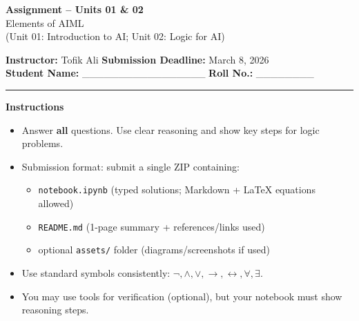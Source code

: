 \documentclass[11pt,a4paper]{article}
\newcommand{\SubmissionDeadline}{March 8, 2026}
\begin{document}
\begin{center}
  {\LARGE \textbf{Assignment -- Units 01 \& 02}}\\[0.25em]
  {\large Elements of AIML}\\[0.25em]
  \normalsize (Unit 01: Introduction to AI; Unit 02: Logic for AI)
\end{center}

\noindent
\textbf{Instructor:} Tofik Ali \hfill \textbf{Submission Deadline:} \SubmissionDeadline\\
\textbf{Student Name:} \_\_\_\_\_\_\_\_\_\_\_\_\_\_\_\_\_ \hfill \textbf{Roll No.:} \_\_\_\_\_\_\_\_\\

\vspace{0.6em}
\hrule
\vspace{0.8em}

\textbf{Instructions}
\begin{itemize}[leftmargin=*]
  \item Answer \textbf{all} questions. Use clear reasoning and show key steps for logic problems.
  \item Submission format: submit a single ZIP containing:
    \begin{itemize}[leftmargin=*]
      \item \texttt{notebook.ipynb} (typed solutions; Markdown + LaTeX equations allowed)
      \item \texttt{README.md} (1-page summary + references/links used)
      \item optional \texttt{assets/} folder (diagrams/screenshots if used)
    \end{itemize}
  \item Use standard symbols consistently: $\lnot, \land, \lor, \rightarrow, \leftrightarrow, \forall, \exists$.
  \item You may use tools for verification (optional), but your notebook must show reasoning steps.
\end{itemize}

\vspace{0.6em}
\end{document}
